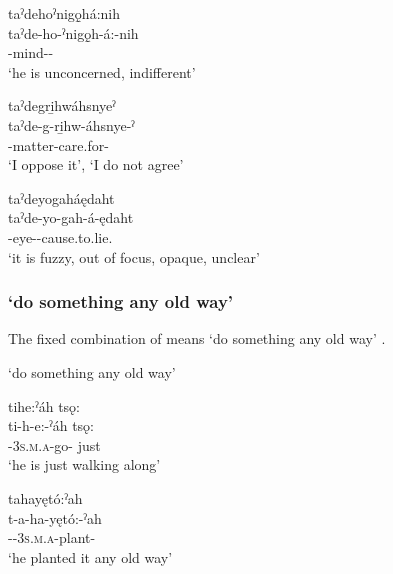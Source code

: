\ea\label{ex:tireq2}

\ea taˀdehoˀnigǫ̱há:nih\\
\gll taˀde-ho-ˀnigǫ̱h-á:-nih\\
{\contrastivedualic}-mind-{\joinerA}-\\
\glt `he is unconcerned, indifferent'

\ex taˀdegri̱hwáhsnyeˀ \\
\gll taˀde-g-ri̱hw-áhsnye-ˀ\\
{\contrastivedualic}-matter-care.for-{\stative}\\
\glt ‘I oppose it’, `I do not agree'

\ex taˀdeyogaháędaht\\
\gll taˀde-yo-gah-á-ędaht\\
{\contrastivedualic}-eye-{\joinerA}-cause.to.\-lie.{\zeropunctual}\\
\glt `it is fuzzy, out of focus, opaque, unclear'
\z
\z


\subsubsection*{ ‘do something any old way’} \label{[ti-verb+ˀah]}
The fixed combination of  means ‘do something any old way’ .

\ea\label{ex:pppexpressionex17}  ‘do something any old way’

\ea tihe:ˀáh tsǫ:\\
\gll ti-h-e:-ˀáh tsǫ:\\
{\contrastive}-\textsc{3s.m.a}-go-{\diminutive} just \\
\glt `he is just walking along'

\ex tahayętó:ˀah\\
\gll t-a-ha-yętó:-ˀah\\
{\contrastive}-{\factual}-\textsc{3s.m.a}-plant-{\diminutive}\\
\glt `he planted it any old way'
\z
\z



